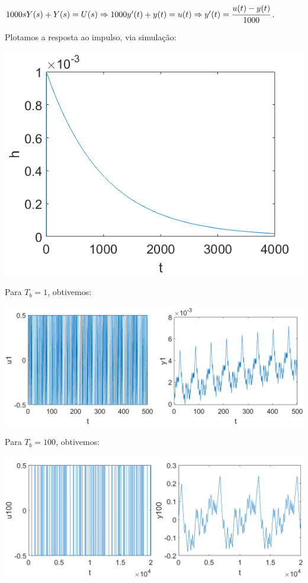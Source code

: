 \documentclass{rbfin}
\begin{document}
$1000 s Y(s) + Y(s) = U(s) \Rightarrow 1000 y'(t) + y(t) = u(t) \Rightarrow y'(t) = \cfrac{u(t) - y(t)}{1000}$. 

\newpage

Plotamos a resposta ao impulso, via simulação:

\begin{center}
\includegraphics[scale=0.666]{5h}
\end{center}

Para $T_b = 1$, obtivemos:

\begin{center}
\includegraphics[scale=0.65]{5u1}
\end{center}

\newpage

Para $T_b = 100$, obtivemos:

\begin{center}
\includegraphics[scale=0.65]{5u100}
\end{center}
\end{document}
